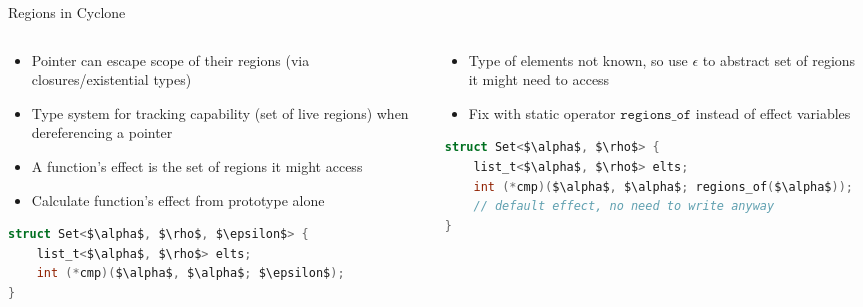 \documentclass[aspectratio=169]{beamer}
\begin{document}
\begin{frame}[fragile]{Regions in Cyclone}
\footnotesize{
  \begin{columns}[T]
    \begin{column}{0.48\textwidth}
    \begin{itemize}
        \item Pointer can escape scope of their regions (via closures/existential types)
        \item Type system for tracking capability (set of live regions) when dereferencing a pointer %
        \item A function's \alert{effect} is the set of regions it might access
        \item Calculate function's effect from prototype alone
    \end{itemize}
    \begin{lstlisting}[language=C,mathescape,basicstyle={\footnotesize\ttfamily}]
struct Set<$\alpha$, $\rho$, $\epsilon$> {
    list_t<$\alpha$, $\rho$> elts;
    int (*cmp)($\alpha$, $\alpha$; $\epsilon$);
}
\end{lstlisting}
    \end{column}

    \begin{column}{0.48\textwidth}
        \begin{itemize}
        \item Type of elements not known, so use $\epsilon$ to abstract set of regions it might need to access
        \item Fix with static operator $\texttt{regions\_of}$ instead of effect variables %
        \end{itemize}
\begin{lstlisting}[language=C,mathescape,basicstyle={\footnotesize\ttfamily}]
struct Set<$\alpha$, $\rho$> {
    list_t<$\alpha$, $\rho$> elts;
    int (*cmp)($\alpha$, $\alpha$; regions_of($\alpha$));
    // default effect, no need to write anyway
}
\end{lstlisting}
    \end{column}
  \end{columns}
  }
\end{frame}
\end{document}
